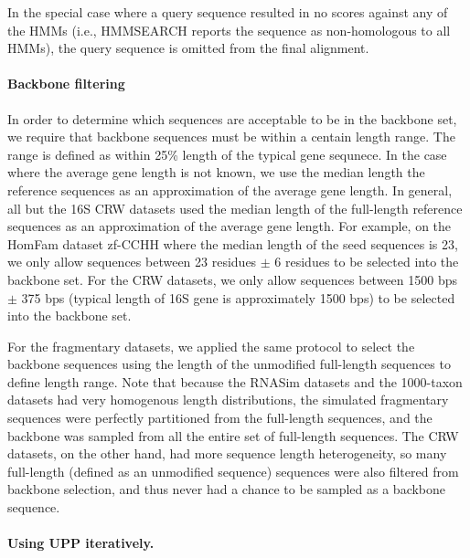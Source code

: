 In the special case where a query sequence resulted in no scores against any of the HMMs (i.e., HMMSEARCH reports the sequence as non-homologous to all HMMs), the query sequence is omitted from the final alignment.  

\paragraph{Backbone filtering}\label{backbone_filtering}
In order to determine which sequences are acceptable to be in the backbone set, we require that backbone sequences must be within a centain length range.  The range is defined as within 25\% length of the typical gene sequnece.  In the case where the average gene length is not known, we use the median length the reference  sequences as an approximation of the average gene length.  In general, all but the 16S CRW datasets used the median length of the full-length reference sequences as an approximation of the average gene length.  For example, on the HomFam dataset zf-CCHH where the median length of the seed sequences is 23, we only allow sequences between 23 residues $\pm$ 6 residues to be selected into the backbone set.  For the CRW datasets, we only allow sequences between 1500 bps $\pm$ 375 bps (typical length of 16S gene is approximately 1500 bps) to be selected into the backbone set.  

For the fragmentary datasets, we applied the same protocol to select the backbone sequences using the length of the unmodified full-length sequences to define length range.  Note that because the RNASim datasets and the 1000-taxon datasets  had very homogenous length distributions, the simulated fragmentary sequences were perfectly partitioned from the full-length sequences, and the backbone was sampled from all the entire set of full-length sequences.  The CRW datasets, on the other hand, had more sequence length heterogeneity, so many full-length (defined as an unmodified sequence) sequences were also filtered from backbone selection, and thus never had a chance to be sampled as a backbone sequence.


\paragraph{Using UPP iteratively. }\label{resampling}

